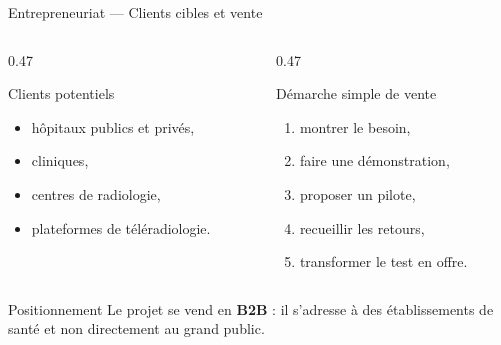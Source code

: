\begin{frame}[t]{Entrepreneuriat --- Clients cibles et vente}
\scriptsize
\begin{columns}[T,onlytextwidth]
\begin{column}{0.47\textwidth}
\begin{block}{Clients potentiels}
\begin{itemize}
\setlength{\itemsep}{0.22em}
\item hôpitaux publics et privés,
\item cliniques,
\item centres de radiologie,
\item plateformes de téléradiologie.
\end{itemize}
\end{block}
\end{column}
\begin{column}{0.47\textwidth}
\begin{block}{Démarche simple de vente}
\begin{enumerate}
\setlength{\itemsep}{0.22em}
\item montrer le besoin,
\item faire une démonstration,
\item proposer un pilote,
\item recueillir les retours,
\item transformer le test en offre.
\end{enumerate}
\end{block}
\end{column}
\end{columns}

\begin{alertblock}{Positionnement}
Le projet se vend en \textbf{B2B} : il s'adresse à des établissements de santé et non directement au grand public.
\end{alertblock}
\end{frame}

